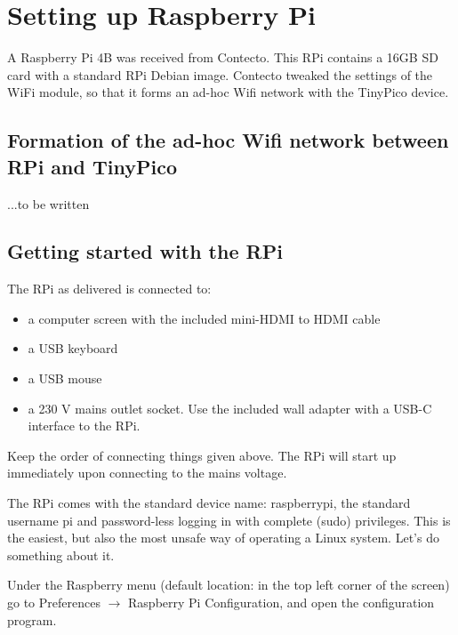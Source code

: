 \section{Setting up Raspberry Pi}

A Raspberry Pi 4B was received from Contecto. This RPi contains a 16GB SD card with a standard RPi Debian image. Contecto tweaked the settings of the WiFi module, so that it forms an ad-hoc Wifi network with the TinyPico device.

\subsection{Formation of the ad-hoc Wifi network between RPi and TinyPico}

...to be written

\subsection{Getting started with the RPi}

The RPi as delivered is connected to:
\begin{itemize}
	\item a computer screen with the included mini-HDMI to HDMI cable
	\item a USB keyboard
	\item a USB mouse
	\item a 230 V mains outlet socket. Use the included wall adapter with a USB-C interface to the RPi. 
\end{itemize} 

Keep the order of connecting things given above. The RPi will start up immediately upon connecting to the mains voltage.

The RPi comes with the standard device name: \textsf{raspberrypi}, the standard username \textsf{pi} and password-less logging in with complete (sudo) privileges. This is the easiest, but also the most unsafe way of operating a Linux system. Let's do something about it.

Under the Raspberry menu (default location: in the top left corner of the screen) go to \textsf{Preferences $\rightarrow$ Raspberry Pi Configuration}, and open the configuration program.

